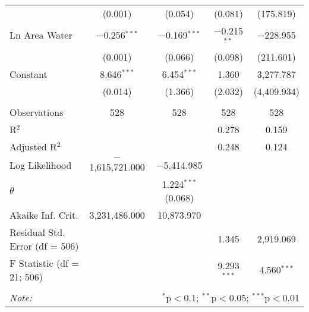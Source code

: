 \begin{table}[!htbp]
\begin{tabular}{@{\extracolsep{5pt}}lcccc}
  & (0.001) & (0.054) & (0.081) & (175.819) \\ 
  Ln Area Water & $-$0.256$^{***}$ & $-$0.169$^{***}$ & $-$0.215$^{**}$ & $-$228.955 \\ 
  & (0.001) & (0.066) & (0.098) & (211.601) \\ 
  Constant & 8.646$^{***}$ & 6.454$^{***}$ & 1.360 & 3,277.787 \\ 
  & (0.014) & (1.366) & (2.032) & (4,409.934) \\ 
 \hline \\[-1.8ex] 
Observations & 528 & 528 & 528 & 528 \\ 
R$^{2}$ &  &  & 0.278 & 0.159 \\ 
Adjusted R$^{2}$ &  &  & 0.248 & 0.124 \\ 
Log Likelihood & $-$1,615,721.000 & $-$5,414.985 &  &  \\ 
$\theta$ &  & 1.224$^{***}$  (0.068) &  &  \\ 
Akaike Inf. Crit. & 3,231,486.000 & 10,873.970 &  &  \\ 
Residual Std. Error (df = 506) &  &  & 1.345 & 2,919.069 \\ 
F Statistic (df = 21; 506) &  &  & 9.293$^{***}$ & 4.560$^{***}$ \\ 
\hline 
\hline \\[-1.8ex] 
\textit{Note:}  & \multicolumn{4}{r}{$^{*}$p$<$0.1; $^{**}$p$<$0.05; $^{***}$p$<$0.01} \\ 
\end{tabular} 
\end{table} 

